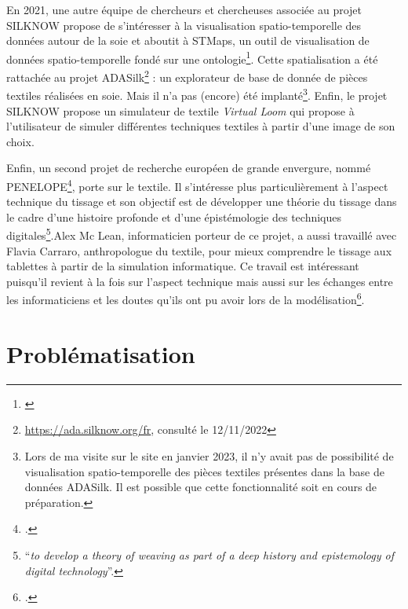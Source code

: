 \documentclass[a4paper, twoside, 12pt]{book}
\begin{document}
En 2021, une autre équipe de chercheurs et chercheuses associée au projet \textsc{SILKNOW} propose de s'intéresser à la visualisation spatio-temporelle des données autour de la soie et aboutit à STMaps, \og un outil de visualisation de données spatio-temporelle fondé sur une ontologie\fg\footnote{\cite{sevillaMultiPurposeOntologyBasedVisualization2021}}. Cette spatialisation a été rattachée au projet ADASilk\footnote{\url{https://ada.silknow.org/fr}, consulté le 12/11/2022} : un explorateur de base de donnée de pièces textiles réalisées en soie. Mais il n'a pas (encore) été implanté\footnote{Lors de ma visite sur le site en janvier 2023, il n'y avait pas de possibilité de visualisation spatio-temporelle des pièces textiles présentes dans la base de données ADASilk. Il est possible que cette fonctionnalité soit en cours de préparation.}. Enfin, le projet \textsc{SILKNOW} propose un simulateur de textile \textit{Virtual Loom} qui propose à l'utilisateur de simuler différentes techniques textiles à partir d'une image de son choix.

Enfin, un second projet de recherche européen de grande envergure, nommé \textsc{PENELOPE}\footcite{PENELOPEWeavingTechnical2022a}, porte sur le textile. Il s'intéresse plus particulièrement à l'aspect technique du tissage et son objectif est de \og développer une théorie du tissage dans le cadre d'une histoire profonde et d'une épistémologie des techniques digitales\footnote{\cite[p.~61]{harlizius-kluckPENELOPEProjectCase2021} \textquotedblleft \textit{to develop a theory of weaving as part of a deep history and epistemology of digital technology}''.}.\fg \:Alex Mc Lean, informaticien porteur de ce projet, a aussi travaillé avec Flavia Carraro, anthropologue du textile, pour mieux comprendre le tissage aux tablettes à partir de la simulation informatique. Ce travail est intéressant puisqu'il revient à la fois sur l'aspect technique mais aussi sur les échanges entre les informaticiens et les doutes qu'ils ont pu avoir lors de la modélisation\footcite{carraroDansPeauFil2019a}. 

\section*{Problématisation}
\end{document}
